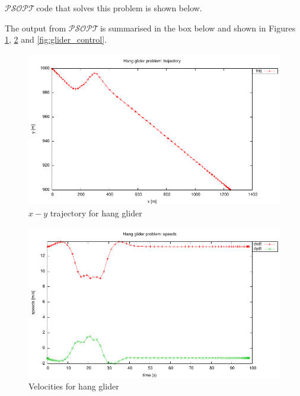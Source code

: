 \documentclass[a4paper,11pt]{report}    %
\newcommand{\psopt}{$\mathcal{PSOPT}$\,}  %
\newenvironment{shadedframe}{%
  \def\FrameCommand{\fcolorbox{black}{shadecolor}}%
  \MakeFramed {\FrameRestore}}
{\endMakeFramed}
\begin{document}
\psopt code that solves this problem is shown below.  

\tiny
\begin{shadedframe}

\end{shadedframe}
\normalsize

The output from \psopt is summarised in the box below and  shown in Figures \ref{fig:glider_traj}, \ref{fig:glider_vel} and \ref{fig:glider_control}.

\begin{shadedframe}

\end{shadedframe}

\begin{figure}
  \centering 
  \includegraphics{../examples/glider/traj}
  \caption{$x-y$ trajectory for hang glider}
 \label{fig:glider_traj}
\end{figure}

\begin{figure}
  \centering 
  \includegraphics{../examples/glider/velocities}
  \caption{Velocities for hang glider}
 \label{fig:glider_vel}
\end{figure}
\end{document}
